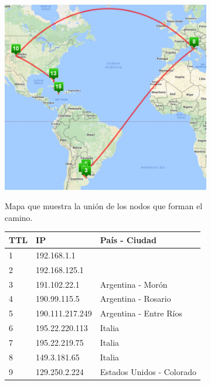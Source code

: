 \begin{figure}[ht]
  \hspace*{-0.4cm}
  \begin{subfigure}[b]{.60\textwidth}
    \includegraphics[width=\textwidth]{Imagenes/jamaica_map.png}
    \label{fig:jamaica_map}
    \caption{Mapa que muestra la unión de los nodos que forman el camino.}
  \end{subfigure}
  \begin{subfigure}[b]{.39\textwidth}
    \footnotesize
    \begin{tabular}{ l l l }
      \hline
      \textbf{TTL} & \textbf{IP} &  \textbf{País - Ciudad} \\ \hline
      1 & 192.168.1.1 &\\ \hline
      2 & 192.168.125.1 &\\ \hline
      3 & 191.102.22.1 & Argentina - Morón\\ \hline
      4 & 190.99.115.5 & Argentina - Rosario\\ \hline
      5 & 190.111.217.249 & Argentina - Entre Ríos\\ \hline
      \rowcolor[RGB]{196,214,255}
      6 & 195.22.220.113 & Italia\\ \hline
      7 & 195.22.219.75 & Italia\\ \hline
      8 & 149.3.181.65 & Italia\\ \hline
      \rowcolor[RGB]{196,214,255}
      9 & 129.250.2.224 & Estados Unidos - Colorado \\ \hline

\end{tabular}
\end{subfigure}
\end{figure}
